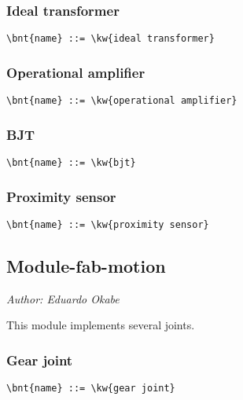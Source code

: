 \subsubsection{Ideal transformer}
\begin{Verbatim}[commandchars=\\\{\}]
    \bnt{name} ::= \kw{ideal transformer}
\end{Verbatim}

\subsubsection{Operational amplifier}
\begin{Verbatim}[commandchars=\\\{\}]
    \bnt{name} ::= \kw{operational amplifier}
\end{Verbatim}

\subsubsection{BJT}
\begin{Verbatim}[commandchars=\\\{\}]
    \bnt{name} ::= \kw{bjt}
\end{Verbatim}

\subsubsection{Proximity sensor}
\begin{Verbatim}[commandchars=\\\{\}]
    \bnt{name} ::= \kw{proximity sensor}
\end{Verbatim}



\subsection{Module-fab-motion}
\emph{Author: Eduardo Okabe}

\noindent
This module implements several joints.

\subsubsection{Gear joint}
\begin{Verbatim}[commandchars=\\\{\}]
    \bnt{name} ::= \kw{gear joint}
\end{Verbatim}

